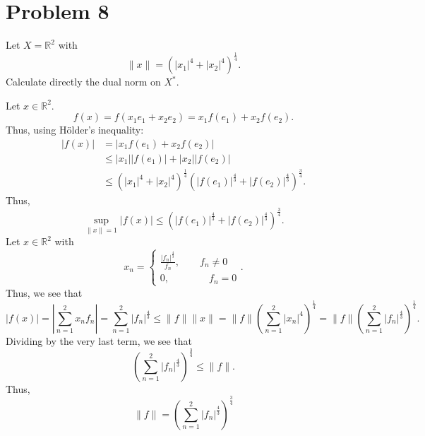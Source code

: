 \documentclass[11pt]{article}
\newcommand{\bbR}{\mathbb{R}}
\begin{document}
\newpage
\section*{Problem 8}
\begin{problem}
    Let $X = \bbR^2$ with \[\|x\| = (|x_1|^{4} + |x_2|^{4})^\frac{1}{4}.\] Calculate directly the dual norm on $X^*.$ 
\end{problem}
\begin{solution}
   Let $x\in \bbR^2.$
    \[f(x) = f(x_1e_1 + x_2e_2) = x_1f(e_1)+ x_2f(e_2).\] Thus, using H\"older's inequality:
    \begin{align*}
    |f(x)| &= |x_1f(e_1)+ x_2f(e_2)|\\
    &\leq |x_1||f(e_1)| + |x_2||f(e_2)|\\
    &\leq (|x_1|^4 + |x_2|^4)^\frac{1}{4}(|f(e_1)|^\frac{4}{3} + |f(e_2)|^\frac{4}{3})^\frac{3  }{4}.
    \end{align*}
    Thus, 
    \[\sup_{\|x\| = 1} |f(x)| \leq (|f(e_1)|^\frac{4}{3} + |f(e_2)|^\frac{4}{3})^\frac{3  }{4}.\]
    Let $x\in \bbR^2$ with 
    \[x_n = \begin{cases}
        \frac{|f_n|^\frac{4}{3}}{f_n}, \qquad f_n \neq 0\\
        0, \qquad \;\;\:\: \quad f_n = 0
    \end{cases}.\] Thus, we see that 
    \[|f(x)| = \left|\sum_{n=1}^2x_nf_n\right| = \sum_{n=1}^2 |f_n|^\frac{4}{3} \leq \|f\|\|x\| = \|f\|\left(\sum_{n=1}^2|x_n|^4\right)^\frac{1}{4} = \|f\|\left(\sum_{n=1}^2 |f_n|^\frac{4}{3}\right)^\frac{1}{4}.\] Dividing by the very last term, we see that 
    \[\left(\sum_{n=1}^2 |f_n|^\frac{4}{3}\right)^\frac{3}{4} \leq \|f\|.\] Thus, 
    \[\|f\| = \left(\sum_{n=1}^2 |f_n|^\frac{4}{3}\right)^\frac{3}{4}\]
\end{solution}

\newpage
\end{document}
